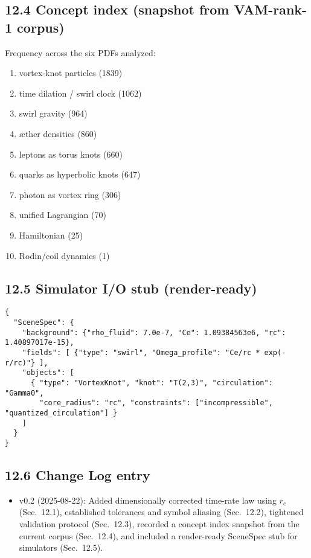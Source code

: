 \documentclass[11pt]{article}
\begin{document}
\subsection*{12.4 Concept index (snapshot from VAM-rank-1 corpus)}

Frequency across the six PDFs analyzed:

\begin{enumerate}
    \item vortex-knot particles (1839)
    \item time dilation / swirl clock (1062)
    \item swirl gravity (964)
    \item æther densities (860)
    \item leptons as torus knots (660)
    \item quarks as hyperbolic knots (647)
    \item photon as vortex ring (306)
    \item unified Lagrangian (70)
    \item Hamiltonian (25)
    \item Rodin/coil dynamics (1)
\end{enumerate}

\subsection*{12.5 Simulator I/O stub (render-ready)}

\begin{verbatim}
{
  "SceneSpec": {
    "background": {"rho_fluid": 7.0e-7, "Ce": 1.09384563e6, "rc": 1.40897017e-15},
    "fields": [ {"type": "swirl", "Omega_profile": "Ce/rc * exp(-r/rc)"} ],
    "objects": [
      { "type": "VortexKnot", "knot": "T(2,3)", "circulation": "Gamma0",
        "core_radius": "rc", "constraints": ["incompressible", "quantized_circulation"] }
    ]
  }
}
\end{verbatim}

\subsection*{12.6 Change Log entry}

\begin{itemize}
    \item v0.2 (2025-08-22): Added dimensionally corrected time-rate law using $r_c$ (Sec.~12.1), established tolerances and symbol aliasing (Sec.~12.2), tightened validation protocol (Sec.~12.3), recorded a concept index snapshot from the current corpus (Sec.~12.4), and included a render-ready SceneSpec stub for simulators (Sec.~12.5).
\end{itemize}
\end{document}
